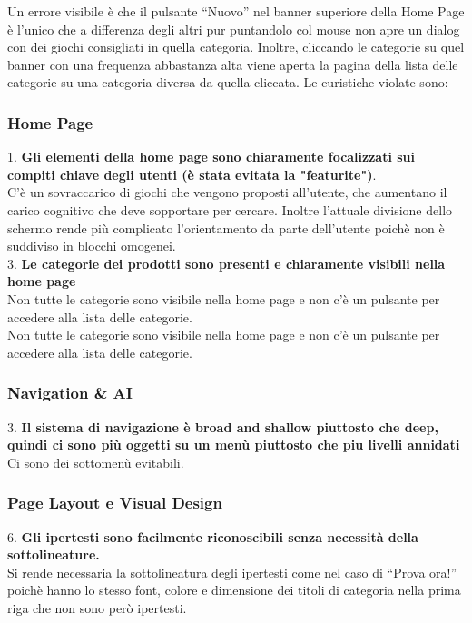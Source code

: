 \documentclass[../Report.tex]{subfiles}
\begin{document}
    Un errore visibile è che il pulsante “Nuovo” nel banner superiore della Home Page è l’unico che a differenza degli altri pur puntandolo col mouse non apre un dialog con dei giochi consigliati in quella categoria. Inoltre, cliccando le categorie su quel banner con una frequenza abbastanza alta viene aperta la pagina della lista delle categorie su una categoria diversa da quella cliccata. Le euristiche violate sono:

    \subsubsection{Home Page}
        1. \textbf{ Gli elementi della home page sono chiaramente focalizzati sui compiti chiave degli utenti (è stata evitata la "featurite")}.\\
        C’è un sovraccarico di giochi che vengono proposti all’utente, che aumentano il carico cognitivo che deve sopportare per cercare. Inoltre l’attuale divisione dello schermo rende più complicato l’orientamento da parte dell’utente poichè non è suddiviso in blocchi omogenei.\\

        3. \textbf{Le categorie dei prodotti sono presenti e chiaramente visibili nella home page}\\
        Non tutte le categorie sono visibile nella home page e non c’è un pulsante per accedere alla lista delle categorie.
\\ Non tutte le categorie sono visibile nella home page e non c’è un pulsante per accedere alla lista delle categorie.    
    \subsubsection{Navigation \& AI }
    3. \textbf{Il sistema di navigazione è broad and shallow piuttosto che deep, quindi ci sono più oggetti su un menù piuttosto che piu livelli annidati\\} 
 	Ci sono dei sottomenù evitabili. 

    \subsubsection{Page Layout e Visual Design}
    6. \textbf{Gli ipertesti sono facilmente riconoscibili senza necessità della sottolineature. }\\
    Si rende necessaria la sottolineatura degli ipertesti come nel caso di “Prova ora!” poichè hanno lo stesso font, colore e dimensione dei titoli di categoria nella prima riga che non sono però ipertesti. \\
\end{document}
